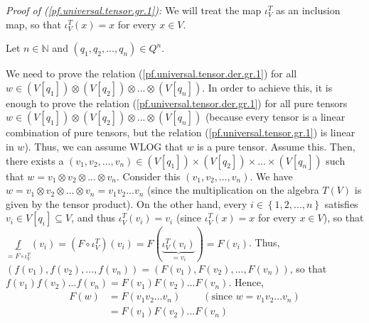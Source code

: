 \documentclass[etingof-lie.tex]{subfiles}
\begin{document}
\begin{verlong}
\textit{Proof of (\ref{pf.universal.tensor.gr.1}):} We will treat the map
$\iota_{V}^{T}$ as an inclusion map, so that $\iota_{V}^{T}\left(  x\right)
=x$ for every $x\in V$.

Let $n\in\mathbb{N}$ and $\left(  q_{1},q_{2},...,q_{n}\right)  \in Q^{n}$.

We need to prove the relation (\ref{pf.universal.tensor.der.gr.1}) for all
$w\in\left(  V\left[  q_{1}\right]  \right)  \otimes\left(  V\left[
q_{2}\right]  \right)  \otimes...\otimes\left(  V\left[  q_{n}\right]
\right)  $. In order to achieve this, it is enough to prove the relation
(\ref{pf.universal.tensor.der.gr.1}) for all pure tensors $w\in\left(
V\left[  q_{1}\right]  \right)  \otimes\left(  V\left[  q_{2}\right]  \right)
\otimes...\otimes\left(  V\left[  q_{n}\right]  \right)  $ (because every
tensor is a linear combination of pure tensors, but the relation
(\ref{pf.universal.tensor.gr.1}) is linear in $w$). Thus, we can assume WLOG
that $w$ is a pure tensor. Assume this. Then, there exists a $\left(
v_{1},v_{2},...,v_{n}\right)  \in\left(  V\left[  q_{1}\right]  \right)
\times\left(  V\left[  q_{2}\right]  \right)  \times...\times\left(  V\left[
q_{n}\right]  \right)  $ such that $w=v_{1}\otimes v_{2}\otimes...\otimes
v_{n}$. Consider this $\left(  v_{1},v_{2},...,v_{n}\right)  $. We have
$w=v_{1}\otimes v_{2}\otimes...\otimes v_{n}=v_{1}v_{2}...v_{n}$ (since the
multiplication on the algebra $T\left(  V\right)  $ is given by the tensor
product). On the other hand, every $i\in\left\{  1,2,...,n\right\}  $
satisfies $v_{i}\in V\left[  q_{i}\right]  \subseteq V$, and thus $\iota
_{V}^{T}\left(  v_{i}\right)  =v_{i}$ (since $\iota_{V}^{T}\left(  x\right)
=x$ for every $x\in V$), so that $\underbrace{f}_{=F\circ\iota_{V}^{T}}\left(
v_{i}\right)  =\left(  F\circ\iota_{V}^{T}\right)  \left(  v_{i}\right)
=F\left(  \underbrace{\iota_{V}^{T}\left(  v_{i}\right)  }_{=v_{i}}\right)
=F\left(  v_{i}\right)  $. Thus, $\left(  f\left(  v_{1}\right)  ,f\left(
v_{2}\right)  ,...,f\left(  v_{n}\right)  \right)  =\left(  F\left(
v_{1}\right)  ,F\left(  v_{2}\right)  ,...,F\left(  v_{n}\right)  \right)  $,
so that $f\left(  v_{1}\right)  f\left(  v_{2}\right)  ...f\left(
v_{n}\right)  =F\left(  v_{1}\right)  F\left(  v_{2}\right)  ...F\left(
v_{n}\right)  $. Hence,%
\begin{align*}
F\left(  w\right)   &  =F\left(  v_{1}v_{2}...v_{n}\right)
\ \ \ \ \ \ \ \ \ \ \left(  \text{since }w=v_{1}v_{2}...v_{n}\right) \\
&  =F\left(  v_{1}\right)  F\left(  v_{2}\right)  ...F\left(  v_{n}\right)

\end{align*}
\end{verlong}
\end{document}

